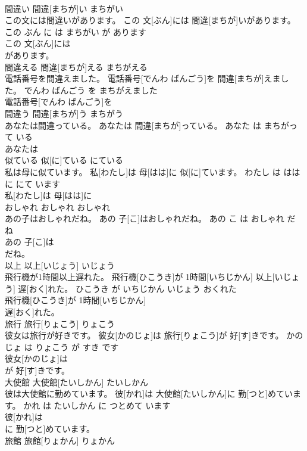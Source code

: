 \documentclass[8pt]{extreport}
\begin{document}
\begin{CJK}{UTF8}{min}
\\	間違い	間違[まちが]い	まちがい	
\\	この文には間違いがあります。	この 文[ぶん]には 間違[まちが]いがあります。	この ぶん に は まちがい が あります	
\\	この 文[ぶん]には
\\	があります。			
\\	間違える	間違[まちが]える	まちがえる	
\\	電話番号を間違えました。	電話番号[でんわ ばんごう]を 間違[まちが]えました。	でんわ ばんごう を まちがえました	
\\	電話番号[でんわ ばんごう]を
\\	間違う	間違[まちが]う	まちがう	
\\	あなたは間違っている。	あなたは 間違[まちが]っている。	あなた は まちがって いる	
\\	あなたは
\\	似ている	似[に]ている	にている	
\\	私は母に似ています。	私[わたし]は 母[はは]に 似[に]ています。	わたし は はは に にて います	
\\	私[わたし]は 母[はは]に
\\	おしゃれ	おしゃれ	おしゃれ	
\\	あの子はおしゃれだね。	あの 子[こ]はおしゃれだね。	あの こ は おしゃれ だ ね	
\\	あの 子[こ]は
\\	だね。			
\\	以上	以上[いじょう]	いじょう	
\\	飛行機が1時間以上遅れた。	飛行機[ひこうき]が 1時間[いちじかん] 以上[いじょう] 遅[おく]れた。	ひこうき が いちじかん いじょう おくれた	
\\	飛行機[ひこうき]が 1時間[いちじかん]
\\	遅[おく]れた。			
\\	旅行	旅行[りょこう]	りょこう	
\\	彼女は旅行が好きです。	彼女[かのじょ]は 旅行[りょこう]が 好[す]きです。	かのじょ は りょこう が すき です	
\\	彼女[かのじょ]は
\\	が 好[す]きです。			
\\	大使館	大使館[たいしかん]	たいしかん	
\\	彼は大使館に勤めています。	彼[かれ]は 大使館[たいしかん]に 勤[つと]めています。	かれ は たいしかん に つとめて います	
\\	彼[かれ]は
\\	に 勤[つと]めています。			
\\	旅館	旅館[りょかん]	りょかん	

\end{CJK}
\end{document}
